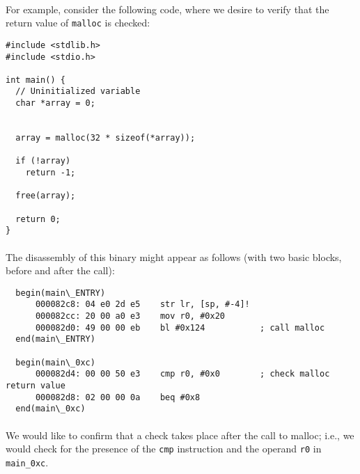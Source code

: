\documentclass[letterpaper,11pt]{article}
\begin{document}
\paragraph{}
For example, consider the following code, where we desire to verify
that the return value of \texttt{malloc} is checked:

\begin{center}
\lstset{language=C, label=malloccheck,
caption=malloc.c, breaklines=true, basicstyle=\tiny, numbers=left}
\begin{lstlisting}
#include <stdlib.h>
#include <stdio.h>

int main() {
  // Uninitialized variable
  char *array = 0;


  array = malloc(32 * sizeof(*array));

  if (!array)
    return -1;

  free(array);

  return 0;
}
\end{lstlisting}
\end{center}

\paragraph{}
The disassembly of this binary might appear as follows (with two basic blocks,
before and after the call): 

\begin{center}
\lstset{language=C, label=mallocdisasm,
caption=Malloc disassembly, breaklines=true, basicstyle=\tiny, numbers=none}
\begin{lstlisting}
  begin(main\_ENTRY) 
      000082c8: 04 e0 2d e5    str lr, [sp, #-4]! 
      000082cc: 20 00 a0 e3    mov r0, #0x20       
      000082d0: 49 00 00 eb    bl #0x124           ; call malloc
  end(main\_ENTRY)
 
  begin(main\_0xc) 
      000082d4: 00 00 50 e3    cmp r0, #0x0        ; check malloc return value
      000082d8: 02 00 00 0a    beq #0x8            
  end(main\_0xc)
\end{lstlisting}
\end{center}

\paragraph{}
We would like to confirm that a check takes place after the call to malloc;
i.e., we would check for the presence of the \texttt{cmp} instruction and the
operand \texttt{r0} in \texttt{main\_0xc}.
\end{document}
